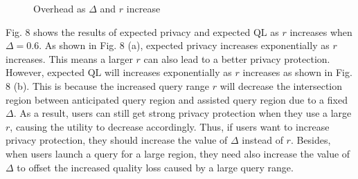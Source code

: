 \documentclass[a4paper,fleqn]{cas-dc}
\begin{document}
\begin{figure}
\centering
    \caption{Overhead as $\Delta$ and $r$ increase }
    \label{fig:foo}
\end{figure}

Fig. 8 shows the results of expected privacy and expected $\mathrm{QL}$ as $r$ increases when $\Delta=0.6$. As shown in Fig. 8 (a), expected privacy increases exponentially as $r$ increases. This means a larger $r$ can also lead to a better privacy protection. However, expected $\mathrm{QL}$ will increases exponentially as $r$ increases as shown in Fig. 8 (b). This is because the increased query range $r$ will decrease the intersection region between anticipated query region and assisted query region due to a fixed $\Delta$. As a result, users can still get strong privacy protection when they use a large $r$, causing the utility to decrease accordingly. Thus, if users want to increase privacy protection, they should increase the value of $\Delta$ instead of $r$. Besides, when users launch a query for a large region, they need also increase the value of $\Delta$ to offset the increased quality loss caused by a large query range.
\end{document}
